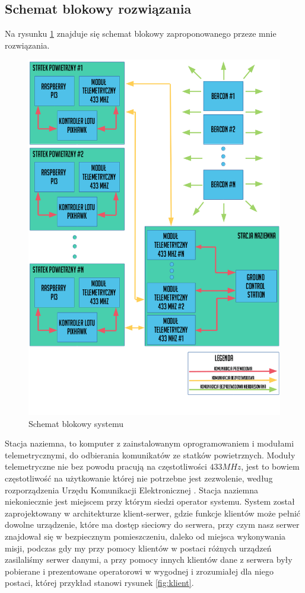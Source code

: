 \subsection{Schemat blokowy rozwiązania}
Na rysunku \ref{fig:schematblokowy} znajduje się schemat blokowy zaproponowanego przeze mnie rozwiązania.
\begin{figure}[!th]
    \centering
    \includegraphics[width=14cm]{zalaczniki/obrazy/schemat_ogolny.png}
    \caption{Schemat blokowy systemu}
    \label{fig:schematblokowy}
\end{figure}

Stacja naziemna, to komputer z zainstalowanym oprogramowaniem i modułami telemetrycznymi, do odbierania komunikatów ze statków powietrznych. Moduły telemetryczne nie bez powodu pracują na częstotliwości $433 MHz$, jest to bowiem częstotliwość na użytkowanie której nie potrzebne jest zezwolenie, według rozporządzenia Urzędu Komunikacji Elektronicznej \cite{rozporzadzenieuke}. Stacja naziemna niekoniecznie jest miejscem przy którym siedzi operator systemu. System został zaprojektowany w architekturze klient-serwer, gdzie funkcje klientów może pełnić dowolne urządzenie, które ma dostęp sieciowy do serwera, przy czym nasz serwer znajdował się w bezpiecznym pomieszczeniu, daleko od miejsca wykonywania misji, podczas gdy my przy pomocy klientów w postaci różnych urządzeń zasilaliśmy serwer danymi, a przy pomocy innych klientów dane z serwera były pobierane i prezentowane operatorowi w wygodnej i zrozumiałej dla niego postaci, której przykład stanowi rysunek \ref{fig:klient}.

